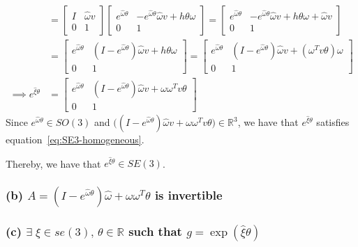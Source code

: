 \begin{align*}
      \\ & =
      \begin{bmatrix}
            I & \hat \omega v \\
            0 & 1
      \end{bmatrix}
      \begin{bmatrix}
            e^{\hat \omega \theta}
              &
            -e^{\hat \omega \theta} \hat \omega v + h \theta \omega
            \\
            0 & 1
      \end{bmatrix}
      =
      \begin{bmatrix}
            e^{\hat \omega \theta}
              &
            -e^{\hat \omega \theta} \hat \omega v + h \theta \omega + \hat \omega v
            \\
            0 & 1
      \end{bmatrix}
      \\ & =
      \begin{bmatrix}
            e^{\hat \omega \theta}
              &
            (I - e^{\hat \omega \theta}) \hat \omega v + h \theta \omega
            \\
            0 & 1
      \end{bmatrix}
      =
      \begin{bmatrix}
            e^{\hat \omega \theta}
              &
            (I - e^{\hat \omega \theta}) \hat \omega v + (\omega^T v \theta) \omega
            \\
            0 & 1
      \end{bmatrix}
      \\
      \implies
      e^{\hat{\xi} \theta}
       & =
      \begin{bmatrix}
            e^{\hat \omega \theta}
              &
            (I - e^{\hat \omega \theta}) \hat \omega v + \omega \omega^T v \theta
            \\
            0 & 1
      \end{bmatrix}
\end{align*}
Since \( e^{\hat \omega \theta} \in SO(3) \) and \( \Big( (I - e^{\hat \omega \theta}) \hat \omega v + \omega \omega^T v \theta \Big) \in \mathbb{R}^3 \), we have that \( e^{\hat{\xi} \theta} \) satisfies equation~\eqref{eq:SE3-homogeneous}.

Thereby, we have that \underline{\( e^{\hat{\xi} \theta} \in SE(3) \)}.

\clearpage
\subsubsection*{(b) \( A = \left(I-e^{\hat{\omega} \theta}\right) \hat{\omega}+\omega \omega^{T} \theta \) is invertible}

\subsubsection*{(c) \( \exists \; \xi \in se(3), \, \theta \in \mathbb{R} \) such that \( g = \exp(\hat{\xi} \theta) \)}
